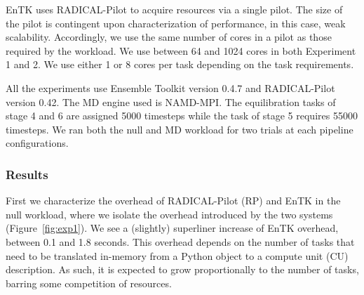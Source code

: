 EnTK uses RADICAL-Pilot to acquire resources via a single pilot. The size of
the pilot is contingent upon characterization of performance, in this case,
weak scalability. Accordingly, we use the same number of cores in a pilot as
those required by the workload. We use between 64 and 1024 cores in both
Experiment 1 and 2.  We use either 1 or 8 cores per task depending on the task
requirements.




All the experiments use Ensemble Toolkit version 0.4.7 and RADICAL-Pilot
version 0.42. The MD engine used is NAMD-MPI\@. The equilibration %
tasks of stage 4 and 6 are assigned 5000 timesteps while the task of stage 5
requires 55000 timesteps. We ran both the null and MD workload for two trials
at each pipeline configurations.

\subsubsection{Results}\label{ssec:exp_results}

First we characterize the overhead of RADICAL-Pilot (RP) and EnTK in the 
null workload, where we isolate the %
overhead introduced by the two %
systems (Figure~\ref{fig:exp1}). We see a (slightly) superliner
increase of EnTK overhead, between 0.1 and 1.8 seconds. This overhead depends
on the number of tasks that need to be translated in-memory from a Python
object to a compute unit (CU) description. As such, it is expected to grow
proportionally to the number of tasks, barring some competition of resources.

